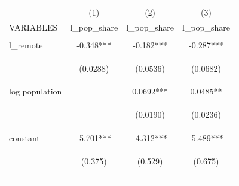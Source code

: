 \documentclass[12 pt]{article}
\begin{document}
\begin{table}
    \centering
    \begin{tabular}{lccc} \hline
     & (1) & (2) & (3) \\
    VARIABLES & l\_pop\_share & l\_pop\_share & l\_pop\_share \\ \hline
    \vspace{4pt} & \begin{footnotesize}\end{footnotesize} & \begin{footnotesize}\end{footnotesize} & \begin{footnotesize}\end{footnotesize} \\
    l\_remote & -0.348*** & -0.182*** & -0.287*** \\
    \vspace{4pt} & \begin{footnotesize}(0.0288)\end{footnotesize} & \begin{footnotesize}(0.0536)\end{footnotesize} & \begin{footnotesize}(0.0682)\end{footnotesize} \\
    log population &  & 0.0692*** & 0.0485** \\
    \vspace{4pt} & \begin{footnotesize}\end{footnotesize} & \begin{footnotesize}(0.0190)\end{footnotesize} & \begin{footnotesize}(0.0236)\end{footnotesize} \\
    constant & -5.701*** & -4.312*** & -5.489*** \\
     & \begin{footnotesize}(0.375)\end{footnotesize} & \begin{footnotesize}(0.529)\end{footnotesize} & \begin{footnotesize}(0.675)\end{footnotesize} \\
    \vspace{4pt} & \begin{footnotesize}\end{footnotesize} & \begin{footnotesize}\end{footnotesize} & \begin{footnotesize}\end{footnotesize} \\

\end{tabular}
\end{table}
\end{document}
